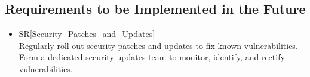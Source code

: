 \documentclass{article}
\newcommand{\srref}[1]{SR\ref{#1}}
\begin{document}
\subsection{Requirements to be Implemented in the Future}
\begin{itemize}
    \item \srref{Security_Patches_and_Updates} \\
    Regularly roll out security patches and updates to fix known vulnerabilities. \\
    Form a dedicated security updates team to monitor, identify, and rectify vulnerabilities. \\
\end{itemize}
\end{document}
